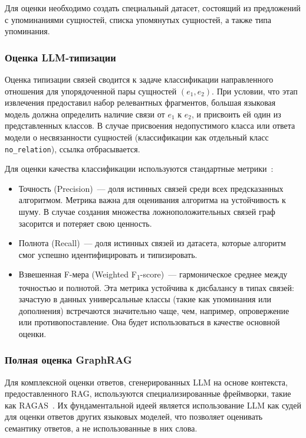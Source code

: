 Для оценки необходимо создать специальный датасет, состоящий
из предложений с упоминаниями сущностей, списка упомянутых сущностей,
а также типа упоминания.

\subsubsection*{Оценка LLM-типизации}

Оценка типизации связей сводится к задаче классификации направленного
отношения для упорядоченной пары сущностей $(e_1, e_2)$.
При условии, что этап извлечения предоставил набор релевантных фрагментов,
большая языковая модель должна определить наличие связи от $e_1$ к $e_2$,
и присвоить ей один из представленных классов.
В случае присвоения недопустимого класса или
ответа модели о несвязанности сущностей
(классификации как отдельный класс \texttt{no\_relation}),
ссылка отбрасывается.

Для оценки качества классификации используются стандартные метрики~\cite{Manning_2008}:

\begin{itemize}
      \item Точность (Precision)~--- доля истинных связей среди
            всех предсказанных алгоритмом. Метрика важна для оценивания алгоритма на устойчивость к шуму.
            В случае создания множества ложноположительных связей граф засорится и потеряет свою ценность.
      \item Полнота (Recall)~--- доля истинных связей из датасета,
            которые алгоритм смог успешно идентифицировать и типизировать.
      \item Взвешенная F-мера (Weighted F\textsubscript{1}-score)~--- гармоническое
            среднее между точностью и полнотой. Эта метрика устойчива к дисбалансу в типах связей:
            зачастую в данных универсальные классы (такие как упоминания или дополнения)
            встречаются значительно чаще, чем, например, опровержение или противопоставление.
            Она будет использоваться в качестве основной оценки.
\end{itemize}

\subsubsection*{Полная оценка GraphRAG}

Для комплексной оценки ответов, сгенерированных LLM на основе контекста, предоставленного RAG,
используются специализированные фреймворки, такие как RAGAS~\cite{Es_2023}.
Их фундаментальной идеей является использование LLM как судей
для оценки ответов других языковых моделей,
что позволяет оценивать семантику ответов, а не использованные в них слова.

